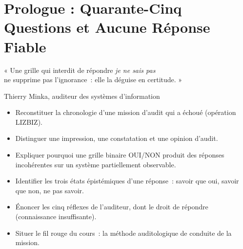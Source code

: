 
\chapter[Prologue : Quarante-Cinq Questions]{Prologue : Quarante-Cinq Questions et Aucune Réponse Fiable}
\label{chap:prologue}

\epigraph{%
    « Une grille qui interdit de répondre \emph{je ne sais pas}\\
    ne supprime pas l'ignorance~: elle la déguise en certitude. »%
}{Thierry Minka, auditeur des systèmes d'information}


\begin{boxobjectifs}
\begin{itemize}
    \item Reconstituer la chronologie d'une mission d'audit qui a échoué
          (opération LIZBIZ).
    \item Distinguer une impression, une constatation et une opinion
          d'audit.
    \item Expliquer pourquoi une grille binaire OUI/NON produit des réponses
          incohérentes sur un système partiellement observable.
    \item Identifier les trois états épistémiques d'une réponse~: savoir que
          oui, savoir que non, ne pas savoir.
    \item Énoncer les cinq réflexes de l'auditeur, dont le droit de répondre
          \NEK{} (connaissance insuffisante).
    \item Situer le fil rouge du cours~: la méthode auditologique de conduite
          de la mission.
\end{itemize}
\end{boxobjectifs}

